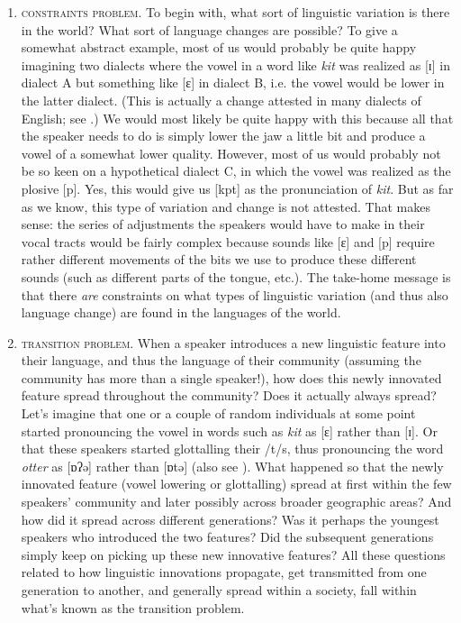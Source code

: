 \begin{enumerate}
    \item \textsc{constraints problem}. To begin with, what sort of linguistic variation is there in the world? What sort of language changes are possible? To give a somewhat abstract example, most of us would probably be quite happy imagining two dialects where the vowel in a word like \emph{kit} was realized as [ɪ] in dialect A but something like [ɛ] in dialect B, i.e. the vowel would be lower in the latter dialect. (This is actually a change attested in many dialects of English; see .) We would most likely be quite happy with this because all that the speaker needs to do is simply lower the jaw a little bit and produce a vowel of a somewhat lower quality. However, most of us would probably not be so keen on a hypothetical dialect C, in which the vowel was realized as the plosive [p]. Yes, this would give us [kpt] as the pronunciation of \emph{kit}. But as far as we know, this type of variation and change is not attested. That makes sense: the series of adjustments the speakers would have to make in their vocal tracts would be fairly complex because sounds like [ɛ] and [p] require rather different movements of the bits we use to produce these different sounds (such as different parts of the tongue, etc.). The take-home message is that there \emph{are} constraints on what types of linguistic variation (and thus also language change) are found in the languages of the world.
    \item \textsc{transition problem}. When a speaker introduces a new linguistic feature into their language, and thus the language of their community (assuming the community has more than a single speaker!), how does this newly innovated feature spread throughout the community? Does it actually always spread? Let's imagine that one or a couple of random individuals at some point started pronouncing the vowel in words such as \textit{kit} as [ɛ] rather than [ɪ]. Or that these speakers started glottalling their /t/s, thus pronouncing the word \emph{otter} as [ɒʔə] rather than [ɒtə] (also see ). What happened so that the newly innovated feature (vowel lowering or glottalling) spread at first within the few speakers' community and later possibly across broader geographic areas? And how did it spread across different generations? Was it perhaps the youngest speakers who introduced the two features? Did the subsequent generations simply keep on picking up these new innovative features? All these questions related to how linguistic innovations propagate, get transmitted from one generation to another, and generally spread within a society, fall within what's known as the transition problem.

\end{enumerate}
